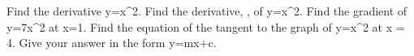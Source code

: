 Find the derivative y=x^2.
Find the derivative, , of y=x^2.
Find the gradient of y=7x^2 at x=1.
Find the equation of the tangent to the graph of y=x^2 at x = 4. Give your answer in the form y=mx+c.